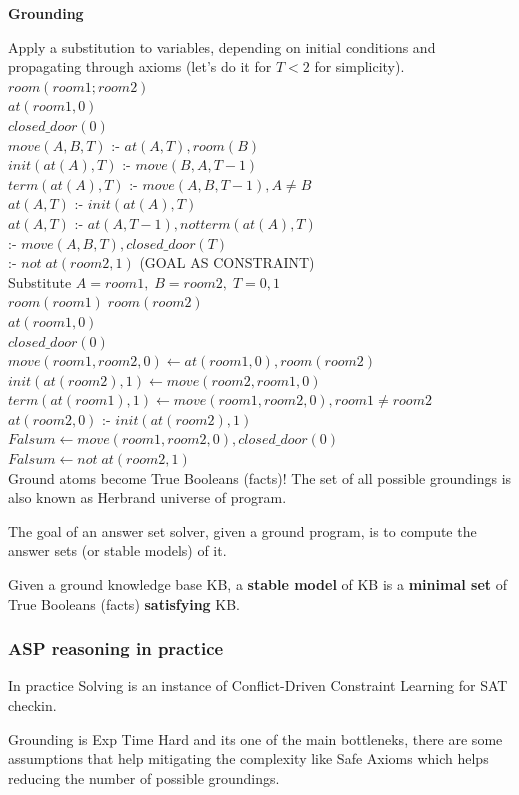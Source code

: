 \textbf{Grounding}

Apply a substitution to variables, depending on initial conditions and propagating through axioms (let's do it for $T<2$ for simplicity).\\

$room(room1;room2)$\\
$at(room1,0)$\\
$closed\_door(0)$\\
$move(A,B,T)$ :- $at(A,T), room(B)$\\
$init(at(A),T)$ :- $move(B,A,T-1)$\\
$term(at(A),T)$ :- $move(A,B,T-1), A\ne B$\\
$at(A,T)$ :- $init(at(A),T)$\\
$at(A,T)$ :- $at(A,T-1), not term(at(A),T)$\\
:- $move(A,B,T), closed\_door(T)$\\
:- $not\;at(room2,1)$ (GOAL AS CONSTRAINT)\\

Substitute
$A=room1,\;B=room2,\;T=0,1$\\

$room(room1)\;room(room2)$\\
$at(room1,0)$\\
$closed\_door(0)$\\
$move(room1,room2,0) \leftarrow at(room1,0), room(room2)$\\
$init(at(room2),1) \leftarrow move(room2,room1,0)$\\
$term(at(room1),1)  \leftarrow move(room1,room2,0), room1\ne room2$\\
$at(room2,0)$ :- $init(at(room2),1)$\\
$Falsum \leftarrow move(room1, room2,0), closed\_door(0)$\\
$Falsum \leftarrow not\;at(room2, 1)$\\

Ground atoms become True Booleans (facts)! The set of all possible groundings is also known as Herbrand universe of program.

\newpage
The goal of an answer set solver, given a ground program, is to compute the answer sets (or stable models) of it.

Given a ground knowledge base KB, a \textbf{stable model} of KB is a \textbf{minimal set} of True Booleans (facts) \textbf{satisfying} KB.

\subsubsection{ASP reasoning in practice}
In practice Solving is an instance of Conflict-Driven Constraint Learning for SAT checkin.

Grounding is Exp Time Hard and its one of the main bottleneks, there are some assumptions that help
mitigating the complexity like Safe Axioms which helps reducing the number of possible groundings.